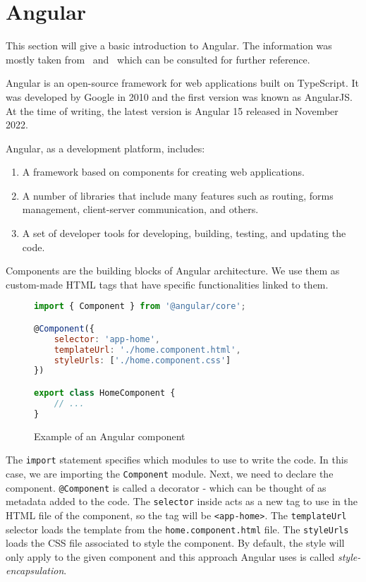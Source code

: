 \section{Angular}\label{sec:angular}
This section will give a basic introduction to Angular. The information was mostly taken from~\citep{angular} and~\citep{murray2018ng}
which can be consulted for further reference.

Angular is an open-source framework for web applications built on TypeScript. It was developed by Google in 2010 and the first version was
known as AngularJS. At the time of writing, the latest version is Angular 15 released in November 2022.

Angular, as a development platform, includes:
\begin{enumerate}
    \item A framework based on components for creating web applications.
    \item A number of libraries that include many features such as routing, forms management, client-server communication, and others.
    \item A set of developer tools for developing, building, testing, and updating the code.
\end{enumerate}

Components are the building blocks of Angular architecture. We use them as custom-made HTML tags that have specific functionalities linked to
them.

\begin{figure}[hbt!]
    \begin{center}
        \begin{lstlisting}[language=JavaScript,label={lst:angular-code-1},belowskip=-1 \baselineskip]
import { Component } from '@angular/core';

@Component({
    selector: 'app-home',
    templateUrl: './home.component.html',
    styleUrls: ['./home.component.css']
})

export class HomeComponent {
    // ...
}
        \end{lstlisting}
    \end{center}
    \caption{Example of an Angular component}
    \label{fig:figure4.1}
\end{figure}

The \texttt{import} statement specifies which modules to use to write the code. In this case, we are importing the
\texttt{Component} module. Next, we need to declare the component. \texttt{@Component} is called a decorator - which can be thought of as
metadata added to the code. The \texttt{selector} inside acts as a new tag to use in the HTML file of the component, so the tag will be
\texttt{<app-home>}. The \texttt{templateUrl} selector loads the template from the \texttt{home.component.html} file. The \texttt{styleUrls}
loads the CSS file associated to style the component. By default, the style will only apply to the given component and this approach Angular
uses is called \emph{style-encapsulation}.

